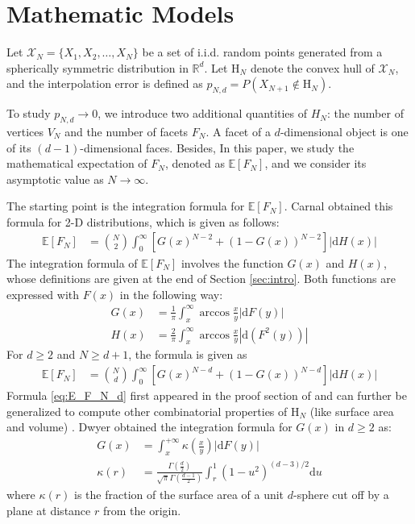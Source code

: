 \documentclass[conference,a4paper]{IEEEtran}
\def\E{\mathbb{E}}
\begin{document}
\section{Mathematic Models}
\label{sec:int_f}

Let $\mathcal{X}_N = \{X_1, X_2, \dots, X_N\}$ be a set of i.i.d. random points generated from
a spherically symmetric distribution in $\mathbb{R}^d$.
Let $\mathrm{H}_N$ denote the convex hull of $\mathcal{X}_N$,
and the interpolation error is defined as $p_{N,d}=P(X_{N+1} \not\in \mathrm{H}_N)$.

To study $p_{N,d} \to 0$, we introduce two additional quantities of $H_N$: the number of vertices
$V_N$ and the number of facets $F_N$.
A facet of a $d$-dimensional object is one of its $(d-1)$-dimensional faces.
Besides, 
In this paper, we study the mathematical expectation
of $F_N$, denoted as $\E[F_N]$, and we consider its asymptotic value as $N\to \infty$.

The starting point is the integration formula for $\E[F_N]$.
Carnal \cite{carnal1970konvexe}
obtained
this formula for 2-D distributions,
which is given as follows:
\begin{align}
     \E[F_N] &= \binom{N}{2} \int_0^{\infty} 
     \left[G(x)^{N-2} + (1-G(x))^{N-2} \right]|\mathrm{d} H(x)| 
     \label{eq:E_F_N_2_d}
\end{align}
The integration formula of $\E[F_N]$ involves the function $G(x)$ and $H(x)$,
whose definitions are given at the end of Section \ref{sec:intro}.
Both functions are expressed with $F(x)$ in the following way:
\begin{align}
   G(x) &=\frac{1}{\pi} \int_x^{\infty}\arccos\frac{x}{y} |\mathrm{d} F(y)| \\
     H(x) &= \frac{2}{\pi} \int_x^{\infty} \arccos \frac{x}{y} |\mathrm{d}(F^2(y))|
     \label{eq:H_expression_2_dim}
\end{align}
For $d\geq 2$ and $N\geq d+1$, the formula is given as
\begin{align}
     \E[F_N] &= \binom{N}{d} \int_0^{\infty} 
     \left[G(x)^{N-d} + (1-G(x))^{N-d} \right]|\mathrm{d} H(x)| 
    \label{eq:E_F_N_d}
\end{align}
Formula \eqref{eq:E_F_N_d} first appeared in the proof section of \cite{raynaud1970enveloppe}
and can further be generalized to compute other combinatorial properties of $\mathrm{H}_N$ (like surface area and volume)
\cite{barany2008random}.
Dwyer obtained the integration formula for $G(x)$ in $d\geq 2$ as:
\begin{align}\label{eq:G_d_kappa}
     G(x) & = \int_x^{+\infty} \kappa \left(\frac{x}{y} \right) |\mathrm{d}F(y)| \\
     \kappa(r) & = \frac{\Gamma(\frac{d}{2})}
     {\sqrt{\pi}\Gamma(\frac{d-1}{2})}\int_r^{1}
     (1-u^2)^{(d-3)/2}\mathrm{d}u\label{eq:kappa_r}
\end{align}
where $\kappa(r)$ is the fraction of the surface area of a unit $d$-sphere
cut off by a plane at distance $r$ from the origin.
\end{document}
